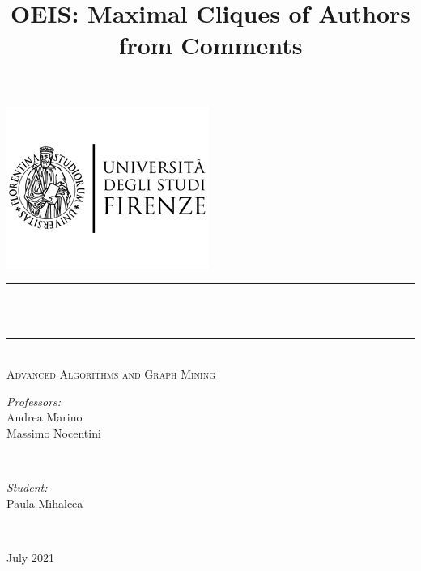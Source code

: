 \documentclass[11pt]{article}
\title{OEIS: Maximal Cliques of Authors from Comments}
\begin{document}
    
    
\begin{titlepage}
	\centering
    \vspace*{0.5 cm}
    \includegraphics[scale = 0.8]{img/unifi_logo.png}\\[1 cm]

	\rule{\linewidth}{0.2 mm} \\[0.4 cm]
	{ \huge \bfseries \thetitle}\\
	\rule{\linewidth}{0.2 mm} \\[1 cm]

	\textsc{\Large Advanced Algorithms and Graph Mining}\\[5 cm]
	\begin{minipage}{0.5\textwidth}
		\begin{flushleft} \large
			\emph{Professors:}\\
			Andrea Marino\\
			Massimo Nocentini\\
			\end{flushleft}
			\end{minipage}~
			\begin{minipage}{0.4\textwidth}
        
		\begin{flushright} \large
			\emph{Student:} \\
			Paula Mihalcea
		\end{flushright}
        
	\end{minipage}\\[0.1 cm]
	
	\vspace*{2.6 cm}
	\begin{center} \large
			July 2021
		\end{center}

	
\end{titlepage}
\end{document}
